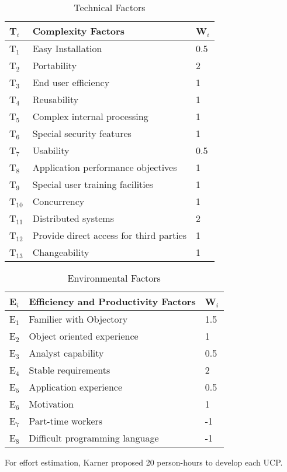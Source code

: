 \documentclass[8pt]{article}
\begin{document}
\begin{table}[h]
\small
\caption{Technical Factors}
\vspace{0.5cm}
\label{table2}
\centering
\begin{tabular}{|p{1.75cm}|p{5cm}|p{1cm}|}
\hline
\textbf{T$_i$} & \textbf{Complexity Factors} & \textbf{W$_i$}\\
\hline
T$_1$ & Easy Installation & 0.5\\
\hline
T$_2$ & Portability & 2\\
\hline
T$_3$ & End user efficiency & 1\\
\hline
T$_4$ & Reusability & 1\\
\hline
T$_5$ & Complex internal processing & 1\\
\hline
T$_6$ & Special security features & 1\\
\hline
T$_7$ & Usability & 0.5\\
\hline
T$_8$ & Application performance objectives & 1\\
\hline
T$_9$ & Special user training facilities & 1\\
\hline
T$_{10}$ & Concurrency & 1\\
\hline
T$_{11}$ & Distributed systems & 2\\
\hline
T$_{12}$ & Provide direct access for third parties & 1\\
\hline
T$_{13}$ & Changeability & 1\\
\hline
\end{tabular}
\end{table}
\vspace{0.5cm}
\begin{table}[h]
\small
\caption{Environmental Factors}
\vspace{.5cm}
\label{table3}
\centering
\begin{tabular}{|p{1cm}|p{5cm}|p{1cm}|}
\hline
\textbf{E$_i$} & \textbf{Efficiency and Productivity Factors} & \textbf{W$_i$}\\
\hline
E$_1$ & Familier with Objectory & 1.5\\
\hline
E$_2$ & Object oriented experience & 1\\
\hline
E$_3$ & Analyst capability & 0.5\\
\hline
E$_4$ & Stable requirements & 2\\
\hline
E$_5$ & Application experience & 0.5\\
\hline
E$_6$ & Motivation & 1\\
\hline
E$_7$ & Part-time workers & -1\\
\hline
E$_8$ & Difficult programming language & -1\\
\hline
\end{tabular}
\end{table}
For effort estimation, Karner proposed 20 person-hours to develop each UCP.
\end{document}
